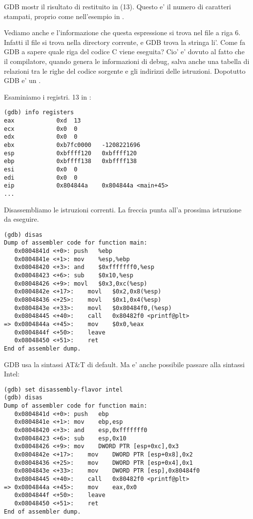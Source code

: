 \ac{GDB} mostr il risultato di \printf restituito in \EAX (13).
Questo e' il numero di caratteri stampati, proprio come nell'esempio in \olly.

Vediamo anche  e l'informazione che questa espressione si trova nel file  a riga 6.
Infatti il file  si trova nella directory corrente, e \ac{GDB} trova la stringa li'.
Come fa \ac{GDB} a sapere quale riga del codice C viene eseguita?
Cio' e' dovuto al fatto che il compilatore, quando genera le informazioni di debug, salva anche una tabella di relazioni tra le righe del
codice sorgente e gli indirizzi delle istruzioni.
Dopotutto GDB e' un .

Esaminiamo i registri.
13 in \EAX:

\begin{lstlisting}
(gdb) info registers
eax            0xd	13
ecx            0x0	0
edx            0x0	0
ebx            0xb7fc0000	-1208221696
esp            0xbffff120	0xbffff120
ebp            0xbffff138	0xbffff138
esi            0x0	0
edi            0x0	0
eip            0x804844a	0x804844a <main+45>
...
\end{lstlisting}

Disassembliamo le istruzioni correnti.
La freccia punta all'a prossima istruzione da eseguire.

\begin{lstlisting}[style=customasmx86]
(gdb) disas
Dump of assembler code for function main:
   0x0804841d <+0>:	push   %ebp
   0x0804841e <+1>:	mov    %esp,%ebp
   0x08048420 <+3>:	and    $0xfffffff0,%esp
   0x08048423 <+6>:	sub    $0x10,%esp
   0x08048426 <+9>:	movl   $0x3,0xc(%esp)
   0x0804842e <+17>:	movl   $0x2,0x8(%esp)
   0x08048436 <+25>:	movl   $0x1,0x4(%esp)
   0x0804843e <+33>:	movl   $0x80484f0,(%esp)
   0x08048445 <+40>:	call   0x80482f0 <printf@plt>
=> 0x0804844a <+45>:	mov    $0x0,%eax
   0x0804844f <+50>:	leave  
   0x08048450 <+51>:	ret    
End of assembler dump.
\end{lstlisting}

\ac{GDB} usa la sintassi AT\&T di default.
Ma e' anche possibile passare alla sintassi Intel:

\begin{lstlisting}[style=customasmx86]
(gdb) set disassembly-flavor intel
(gdb) disas
Dump of assembler code for function main:
   0x0804841d <+0>:	push   ebp
   0x0804841e <+1>:	mov    ebp,esp
   0x08048420 <+3>:	and    esp,0xfffffff0
   0x08048423 <+6>:	sub    esp,0x10
   0x08048426 <+9>:	mov    DWORD PTR [esp+0xc],0x3
   0x0804842e <+17>:	mov    DWORD PTR [esp+0x8],0x2
   0x08048436 <+25>:	mov    DWORD PTR [esp+0x4],0x1
   0x0804843e <+33>:	mov    DWORD PTR [esp],0x80484f0
   0x08048445 <+40>:	call   0x80482f0 <printf@plt>
=> 0x0804844a <+45>:	mov    eax,0x0
   0x0804844f <+50>:	leave  
   0x08048450 <+51>:	ret    
End of assembler dump.
\end{lstlisting}


